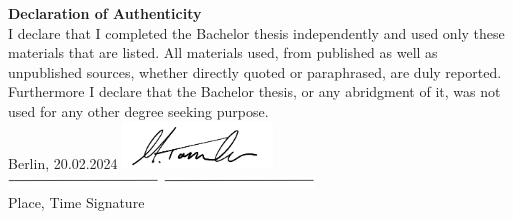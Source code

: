 \thispagestyle{empty}

\Large
\textbf{Declaration of Authenticity}\\

\small
\noindent
I declare that I completed the Bachelor thesis independently and used only these materials that are
listed. All materials used, from published as well as unpublished sources, whether directly quoted or
paraphrased, are duly reported.
Furthermore I declare that the Bachelor thesis, or any abridgment of it, was not used for any other
degree seeking purpose. \\

\vspace{2cm}
\noindent
Berlin, 20.02.2024
\hfill
\includegraphics[width=0.3\textwidth]{figures/Signature}
\\
\includegraphics[width=0.3\textwidth]{figures/Line}
\hfill
\includegraphics[width=0.3\textwidth]{figures/Line}
\\
\noindent
Place, Time 
\hfill
Signature